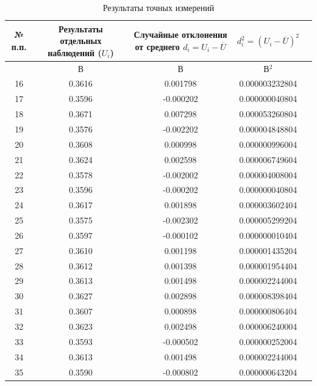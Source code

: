 \begin{center}
\begin{table}[h!]
\centering
\caption{Результаты точных измерений}
\label{tabl:3}
\begin{tabular}{|c|c|c|c|c|}
\hline
\begin{minipage}{7mm}
    № п.п. 
\end{minipage}&
\begin{minipage}{5cm}
    Результаты отдельных наблюдений ($U_i$)
\end{minipage} &
\begin{minipage}{5cm}
    Случайные отклонения от среднего $d_i = U_i - \overline{U}$
\end{minipage} &
\begin{minipage}{5cm}
    $d_i^2 = (U_i - \overline{U})^2$
\end{minipage}\\
\hline
{}&В&В&В$^2$\\
\hline
16 & 0.3616 & 0.001798 & 0.000003232804 \\
17 & 0.3596 & -0.000202 & 0.000000040804 \\
18 & 0.3671 & 0.007298 & 0.000053260804 \\
19 & 0.3576 & -0.002202 & 0.000004848804 \\
20 & 0.3608 & 0.000998 & 0.000000996004 \\
21 & 0.3624 & 0.002598 & 0.000006749604 \\
22 & 0.3578 & -0.002002 & 0.000004008004 \\
23 & 0.3596 & -0.000202 & 0.000000040804 \\
24 & 0.3617 & 0.001898 & 0.000003602404 \\
25 & 0.3575 & -0.002302 & 0.000005299204 \\
26 & 0.3597 & -0.000102 & 0.000000010404 \\
27 & 0.3610 & 0.001198 & 0.000001435204 \\
28 & 0.3612 & 0.001398 & 0.000001954404 \\
29 & 0.3613 & 0.001498 & 0.000002244004 \\
30 & 0.3627 & 0.002898 & 0.000008398404 \\
31 & 0.3607 & 0.000898 & 0.000000806404 \\
32 & 0.3623 & 0.002498 & 0.000006240004 \\
33 & 0.3593 & -0.000502 & 0.000000252004 \\
34 & 0.3613 & 0.001498 & 0.000002244004 \\
35 & 0.3590 & -0.000802 & 0.000000643204 \\

\end{tabular}
\end{table}
\end{center}

